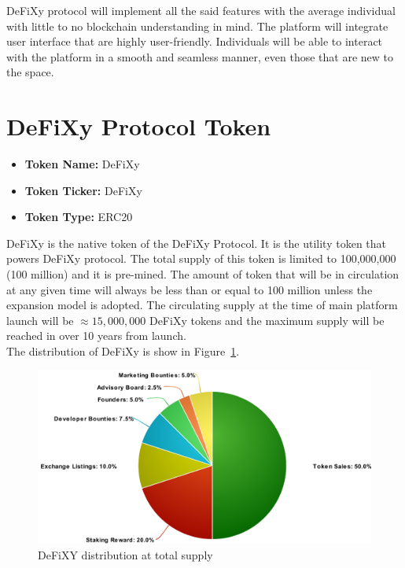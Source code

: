 \documentclass[12pt,onecolumn,letterpaper]{article} %
\begin{document}
DeFiXy protocol will implement all the said features with the average individual with little to no blockchain understanding in mind. The platform will integrate user interface that are highly user-friendly. Individuals will be able to interact with the platform in a smooth and seamless manner, even those that are new to the space.
\newpage
\section{DeFiXy Protocol Token}
\begin{itemize}
    \item \textbf{Token Name:} DeFiXy
    \item \textbf{Token Ticker:} DeFiXy 
     \item \textbf{Token Type:} ERC20
    \end{itemize}
DeFiXy is the native token of the DeFiXy Protocol. It is the utility token that powers DeFiXy protocol. The total supply of this token is limited to 100,000,000 (100 million) and it is pre-mined. The amount of token that will be in circulation at any given time will always be less than or equal to 100 million unless the expansion model is adopted. The circulating supply at the time of main platform launch will be $\approx 15,000,000$ DeFiXy tokens and the maximum supply will be reached in over 10 years from launch.\\
The distribution of DeFiXy is show in Figure~\ref{Chart1}.
   \begin{figure}[h]
\centering \includegraphics[width=1\linewidth]{Distribution_chart}\caption{DeFiXY distribution at total supply} \label{Chart1}
\end{figure}
  \FloatBarrier
  \newpage
\end{document}
